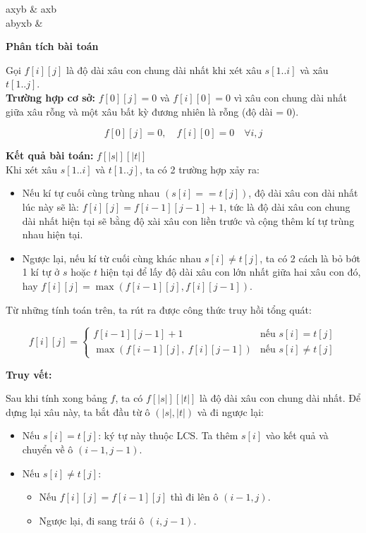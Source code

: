 \begin{sampleio}
axyb & axb\\ 
abyxb &  \\ 
\end{sampleio}

\textbf{Phân tích bài toán}

Gọi \(f[i][j]\) là độ dài xâu con chung dài nhất khi xét xâu $s[1..i]$ và xâu $t[1..j]$.\\

\textbf{Trường hợp cơ sở:} \(f[0][j] = 0\) và \(f[i][0] = 0\) vì xâu con chung dài nhất giữa xâu rỗng và một xâu bất kỳ đương nhiên là rỗng (độ dài = 0).

\[
f[0][j] = 0, \quad f[i][0] = 0 \quad \forall i,j
\]

\textbf{Kết quả bài toán:} $f[|s|][|t|]$\\

Khi xét xâu $s[1..i]$ và $t[1..j]$, ta có 2 trường hợp xảy ra:
\begin{itemize}
    \item Nếu kí tự cuối cùng trùng nhau $(s[i] == t[j])$, độ dài xâu con dài nhất lúc này sẽ là: $f[i][j] = f[i - 1][j - 1] + 1$, tức là độ dài xâu con chung dài nhất hiện tại sẽ bằng độ xài xâu con liền trước và cộng thêm kí tự trùng nhau hiện tại.
    \item Ngược lại, nếu kí từ cuối cùng khác nhau $s[i] \neq t[j]$, ta có 2 cách là bỏ bớt 1 kí tự ở $s$ hoặc $t$ hiện tại để lấy độ dài xâu con lớn nhất giữa hai xâu con đó, hay $f[i][j] = \max (f[i - 1][j], f[i][j - 1])$.
\end{itemize}

Từ những tính toán trên, ta rút ra được công thức truy hồi tổng quát:

\[
f[i][j] =
\begin{cases}
    f[i - 1][j - 1] + 1 & \text{nếu } s[i] = t[j] \\
    \max(f[i - 1][j],\ f[i][j - 1]) & \text{nếu } s[i] \neq t[j]
\end{cases}
\]

\textbf{Truy vết:}

Sau khi tính xong bảng $f$, ta có $f[|s|][|t|]$ là độ dài xâu con chung dài nhất.  
Để dựng lại xâu này, ta bắt đầu từ ô $(|s|, |t|)$ và đi ngược lại:

\begin{itemize}
    \item Nếu $s[i] = t[j]$: ký tự này thuộc LCS.  
    Ta thêm $s[i]$ vào kết quả và chuyển về ô $(i-1, j-1)$.
    \item Nếu $s[i] \neq t[j]$:  
    \begin{itemize}
        \item Nếu $f[i][j] = f[i-1][j]$ thì đi lên ô $(i-1, j)$.
        \item Ngược lại, đi sang trái ô $(i, j-1)$.
    \end{itemize}
\end{itemize}

